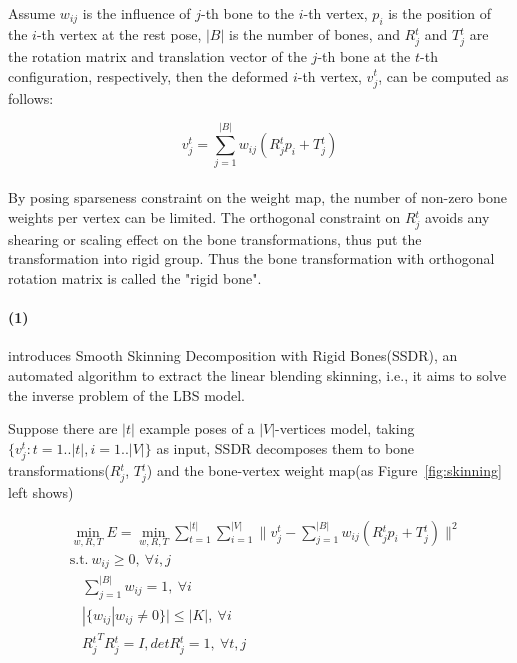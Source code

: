 Assume
$w_{ij}$ is the influence of $j$-th bone to the $i$-th vertex,
$p_{i}$ is the position of the $i$-th vertex at the rest pose,
$|B|$ is the number of bones, and
$R{_{j}^{t}}$ and $T{_{j}^{t}}$ are the rotation matrix and translation vector of the $j$-th bone at the $t$-th configuration, respectively,
then the deformed $i$-th vertex, $v{_{j}^{t}}$, can be computed as follows:

\small{
\begin{equation}
 \label{eq:LBS}
 v{_{j}^{t}}=\sum_{j=1}^{|B|}w_{ij}(R{_{j}^{t}}p_{i}+T{_{j}^{t}})
\end{equation}
}
\\
By posing sparseness constraint on the weight map, the number of non-zero bone weights per vertex can be limited.
The orthogonal constraint on $R{_{j}^{t}}$ avoids any shearing or scaling effect on the bone transformations,
thus put the transformation into rigid group.
Thus the bone transformation with orthogonal rotation matrix is called the "rigid bone".


\paragraph{(1)}
\cite{le2012smooth} introduces Smooth Skinning Decomposition with Rigid Bones(SSDR), an automated algorithm to extract the linear blending skinning, i.e., it aims to solve the inverse problem of the LBS model.

Suppose there are $|t|$ example poses of a $|V|$-vertices model, taking $\{v{_{j}^{t}}: t=1..|t|,i=1..|V|\}$ as input, SSDR decomposes them to bone transformations($R{_{j}^{t}}$, $T{_{j}^{t}}$) and the bone-vertex weight map(as Figure~\ref{fig:skinning} left shows)

\small{
\begin{equation}
 \label{eq:SSDR}
 \begin{split}
 & \min_{w,R,T}E=\min_{w,R,T}\sum_{t=1}^{|t|}\sum_{i=1}^{|V|}\|v{_{j}^{t}}-\sum_{j=1}^{|B|}w_{ij}(R{_{j}^{t}}p_{i}+T{_{j}^{t}})\|^2 \\
 & \mathrm{s.t.}~w_{ij}\ge0,~\forall i,j\\
 & ~~~~\sum_{j=1}^{|B|}w_{ij}=1,~\forall i\\
 & ~~~~|\{w_{ij}|w_{ij}\neq0\}|\le|K|,~\forall i \\
 & ~~~~{R{_{j}^{t}}}^{T}R{_{j}^{t}}=I,detR{_{j}^{t}}=1,~\forall t,j
 \end{split}
\end{equation}
}

